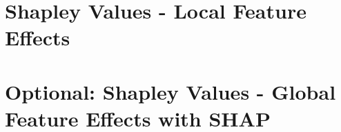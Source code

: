\documentclass[11pt,compress,t,notes=noshow, aspectratio=169, xcolor=table]{beamer}
\begin{document}
\section{Shapley Values - Local Feature Effects}

% 
% 
% 
\section{Optional: Shapley Values - Global Feature Effects with SHAP}

% 

% 
% 
% 
% 
% 
% 


% 
% 
% 


% 
\end{document}
